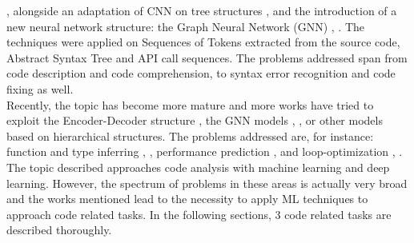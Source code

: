 \cite{bhatia2016automated},
alongside an adaptation of CNN on tree structures \cite{mou2016convolutional}, \cite{bui2018cross}
and the introduction of a new neural network structure: the Graph Neural Network (GNN) \cite{allamanis2017learning}, \cite{scarselli2008graph}. The techniques were applied on 
Sequences of Tokens extracted from the source code, Abstract Syntax Tree \cite{mou2016convolutional} and API call sequences. 
The problems addressed span from code description and code comprehension, to syntax error recognition \cite{santos2018syntax}
and code fixing as well.\\
\newline
Recently, the topic has become more mature and more works have tried to exploit the 
Encoder-Decoder structure \cite{alon2018code2seq}, the GNN models \cite{allamanis2021self}, \cite{brauckmann2020compiler}, or other models 
based on hierarchical structures. The problems addressed are, for instance: function and 
type inferring \cite{alon2019code2vec}, \cite{pradel2020typewriter}, performance prediction \cite{mendis2019ithemal}, and loop-optimization \cite{haj2020neurovectorizer}, \cite{brauckmann2020compiler}.\\
\newline
The topic described approaches code analysis with machine learning and deep learning. However, 
the spectrum of problems in these areas is actually very broad and the works mentioned lead to the 
necessity to apply ML techniques to approach code related tasks. In the following sections, 3 code related
tasks are described thoroughly.

